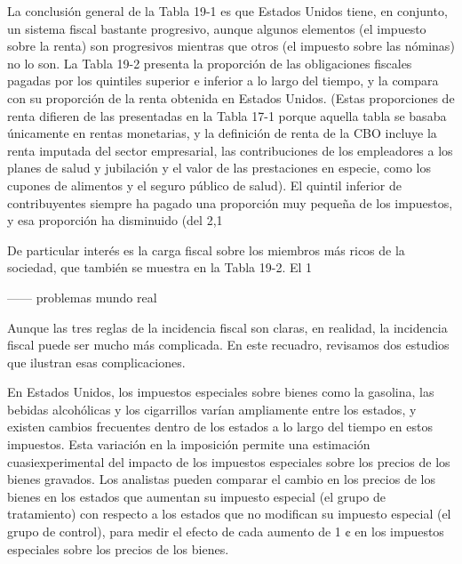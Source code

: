 \documentclass[10pt,a4paper]{article}
\begin{document}
La conclusión general de la Tabla 19-1 es que Estados Unidos tiene, en conjunto, un sistema fiscal bastante progresivo, aunque algunos elementos (el impuesto sobre la renta) son progresivos mientras que otros (el impuesto sobre las nóminas) no lo son. La Tabla 19-2 presenta la proporción de las obligaciones fiscales pagadas por los quintiles superior e inferior a lo largo del tiempo, y la compara con su proporción de la renta obtenida en Estados Unidos. (Estas proporciones de renta difieren de las presentadas en la Tabla 17-1 porque aquella tabla se basaba únicamente en rentas monetarias, y la definición de renta de la CBO incluye la renta imputada del sector empresarial, las contribuciones de los empleadores a los planes de salud y jubilación y el valor de las prestaciones en especie, como los cupones de alimentos y el seguro público de salud). El quintil inferior de contribuyentes siempre ha pagado una proporción muy pequeña de los impuestos, y esa proporción ha disminuido (del 2,1 %

De particular interés es la carga fiscal sobre los miembros más ricos de la sociedad, que también se muestra en la Tabla 19-2. El 1 %



------ problemas mundo real

Aunque las tres reglas de la incidencia fiscal son claras, en realidad, la incidencia fiscal puede ser mucho más complicada. En este recuadro, revisamos dos estudios que ilustran esas complicaciones.

En Estados Unidos, los impuestos especiales sobre bienes como la gasolina, las bebidas alcohólicas y los cigarrillos varían ampliamente entre los estados, y existen cambios frecuentes dentro de los estados a lo largo del tiempo en estos impuestos. Esta variación en la imposición permite una estimación cuasiexperimental del impacto de los impuestos especiales sobre los precios de los bienes gravados. Los analistas pueden comparar el cambio en los precios de los bienes en los estados que aumentan su impuesto especial (el grupo de tratamiento) con respecto a los estados que no modifican su impuesto especial (el grupo de control), para medir el efecto de cada aumento de 1 ¢ en los impuestos especiales sobre los precios de los bienes.
\end{document}
